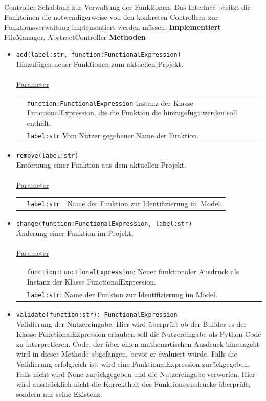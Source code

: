 \documentclass{article}
\begin{document}
\begin{itemize}
Controller Schablone zur Verwaltung der Funktionen. Das Interface besitzt die Funktoinen die notwendigerweise von den konkreten Controllern zur Funktionsverwaltung implementiert werden müssen.
\newline\newline
\textbf{\large{Implementiert}} FileManager, AbstractController
\newline\newline
\textbf{\large{Methoden}}
\begin{itemize}
\item \texttt{add(label:str, function:FunctionalExpression)}\\ Hinzufügen neuer Funktionen zum aktuellen Projekt.\\\\
\underline{{Parameter}}\\
\begin{tabular}{lp{10.7cm}}
 & \texttt{function:FunctionalExpression}  Instanz der Klasse FunctionalExpression, die die Funktion die hinzugefügt werden soll enthält. \\
  & \texttt{label:str} Vom Nutzer gegebener Name der Funktion. \\
\end{tabular}
\item \texttt{remove(label:str)}\\ Entfernung einer Funktion aus dem aktuellen Projekt. \\\\
\underline{{Parameter}}\\
\begin{tabular}{lll}
 & \texttt{label:str} & Name der Funktion zur Identifizierung im Model. \\
\end{tabular}
\item \texttt{change(function:FunctionalExpression, label:str)}\\ Änderung einer Funktion im Projekt.\\\\
\underline{{Parameter}}\\
\begin{tabular}{lp{10.7cm}}
 & \texttt{function:FunctionalExpression}:  Neuer funktionaler Ausdruck als Instanz der Klasse FunctionalExpression.\\
 & \texttt{label:str}:  Name der Funkton zur Identifizierung im Model. \\
\end{tabular}
\item \texttt{validate(function:str): FunctionalExpression}\\ Validierung der Nutzereingabe. Hier wird überprüft ob der Builder es der Klasse FunctionalExpression erlauben soll die Nutzereingabe als Python Code zu interpretieren. Code, der über einen mathematischen Ausdruck hinausgeht wird in dieser Methode abgefangen, bevor er evaluiert würde. Falls die Validierung erfolgreich ist, wird eine FunktionalExpression zurückgegeben. Falls nicht wird None zurückgegeben und die Nutzereingabe verworfen. Hier wird ausdrücklich nicht die Korrektheit des Funktionsausdrucks überprüft, sondern nur seine Existenz.\\\\

\end{itemize}
\end{itemize}
\end{document}
